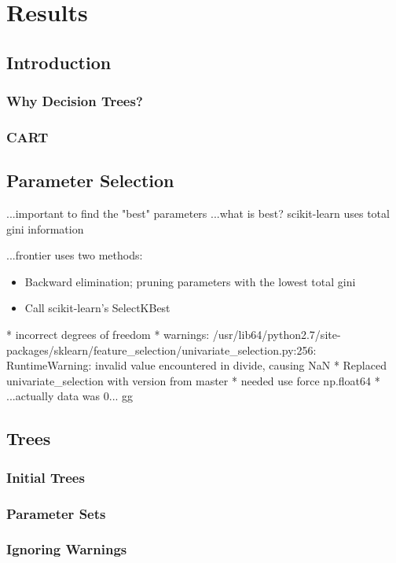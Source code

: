\chapter{Results}
\section{Introduction}
\subsection{Why Decision Trees?}
\subsection{CART}

\section{Parameter Selection}
...important to find the "best" parameters
...what is best? scikit-learn uses total gini information

...frontier uses two methods:
\begin{itemize}
    \item Backward elimination; pruning parameters with the lowest total gini
    \item Call scikit-learn's SelectKBest
\end{itemize}


* incorrect degrees of freedom
* warnings: /usr/lib64/python2.7/site-packages/sklearn/feature\_selection/univariate\_selection.py:256: RuntimeWarning: invalid value encountered in divide, causing NaN
* Replaced univariate\_selection with version from master
* needed use force np.float64
* ...actually data was 0... gg


\section{Trees}
\subsection{Initial Trees}
\subsection{Parameter Sets}
\subsection{Ignoring Warnings}
